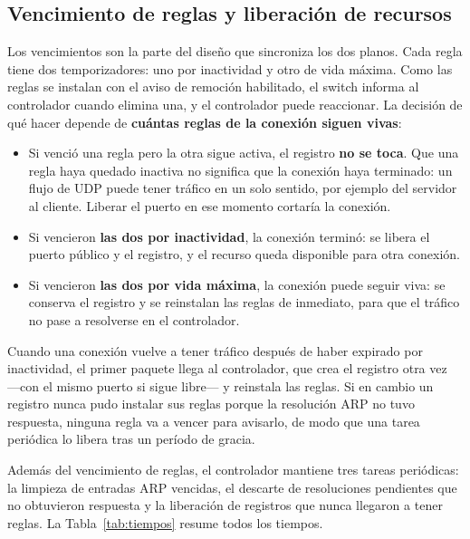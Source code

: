 ﻿\documentclass[10pt,a4paper]{article}
\begin{document}
\subsection{Vencimiento de reglas y liberación de recursos}

Los vencimientos son la parte del diseño que sincroniza los dos planos. Cada regla
tiene dos temporizadores: uno por inactividad y otro de vida máxima. Como las reglas
se instalan con el aviso de remoción habilitado, el switch informa al controlador
cuando elimina una, y el controlador puede reaccionar. La decisión de qué hacer
depende de \textbf{cuántas reglas de la conexión siguen vivas}:

\begin{itemize}[nosep]
    \item Si venció una regla pero la otra sigue activa, el registro \textbf{no se
          toca}. Que una regla haya quedado inactiva no significa que la conexión
          haya terminado: un flujo de UDP puede tener tráfico en un solo sentido, por
          ejemplo del servidor al cliente. Liberar el puerto en ese momento cortaría
          la conexión.
    \item Si vencieron \textbf{las dos por inactividad}, la conexión terminó: se libera
          el puerto público y el registro, y el recurso queda disponible para otra
          conexión.
    \item Si vencieron \textbf{las dos por vida máxima}, la conexión puede seguir
          viva: se conserva el registro y se reinstalan las reglas de inmediato, para
          que el tráfico no pase a resolverse en el controlador.
\end{itemize}

Cuando una conexión vuelve a tener tráfico después de haber expirado por
inactividad, el primer paquete llega al controlador, que crea el registro otra vez
---con el mismo puerto si sigue libre--- y reinstala las reglas. Si en cambio un
registro nunca pudo instalar sus reglas porque la resolución ARP no tuvo respuesta,
ninguna regla va a vencer para avisarlo, de modo que una tarea periódica lo libera
tras un período de gracia.

Además del vencimiento de reglas, el controlador mantiene tres tareas periódicas:
la limpieza de entradas ARP vencidas, el descarte de resoluciones pendientes que no
obtuvieron respuesta y la liberación de registros que nunca llegaron a tener reglas.
La Tabla~\ref{tab:tiempos} resume todos los tiempos.
\end{document}
